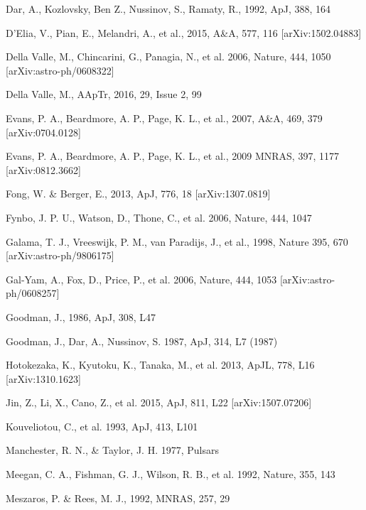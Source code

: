\documentclass[twocolumn]{aastex61}
\begin{document}
\begin{references}
Dar, A.,  Kozlovsky, Ben Z., Nussinov, S., Ramaty, R., 1992, ApJ, 388, 164	

D'Elia, V., Pian, E., Melandri, A., et al., 2015, A\&A, 577, 116 [arXiv:1502.04883]

Della Valle, M.,  Chincarini, G.,  Panagia, N., et al.
2006, Nature, 444, 1050 [arXiv:astro-ph/0608322]

Della Valle, M., AApTr, 2016,  29, Issue 2, 99

Evans, P. A., Beardmore, A. P., Page, K. L., et al., 2007, A\&A, 469, 379 [arXiv:0704.0128]

Evans, P. A., Beardmore, A. P., Page, K. L., et al., 2009 MNRAS, 397, 1177 [arXiv:0812.3662]

Fong, W. \& Berger, E., 2013, ApJ, 776, 18 [arXiv:1307.0819]  

Fynbo, J. P. U., Watson, D., Thone, C., et al. 2006, Nature, 444, 1047 

Galama, T. J., Vreeswijk, P. M., van Paradijs, J., et al., 1998, Nature 395, 670 
[arXiv:astro-ph/9806175]

Gal-Yam, A., Fox, D., Price, P., et al. 2006, Nature, 444, 1053
[arXiv:astro-ph/0608257]

Goodman, J., 1986, ApJ, 308, L47

Goodman, J., Dar, A., Nussinov, S. 1987, ApJ, 314, L7 (1987)

Hotokezaka, K., Kyutoku, K., Tanaka, M., et al. 2013, ApJL, 778, L16
[arXiv:1310.1623]

Jin, Z., Li, X.,  Cano, Z., et al.  2015, ApJ, 811, L22 [arXiv:1507.07206]

Kouveliotou, C., et al. 1993, ApJ, 413, L101

Manchester, R. N., \& Taylor, J. H. 1977, Pulsars

Meegan, C. A., Fishman, G. J., Wilson, R. B., et al. 1992, Nature, 355, 143

Meszaros, P. \&  Rees, M. J.,  1992, MNRAS, 257, 29	


\end{references}
\end{document}
